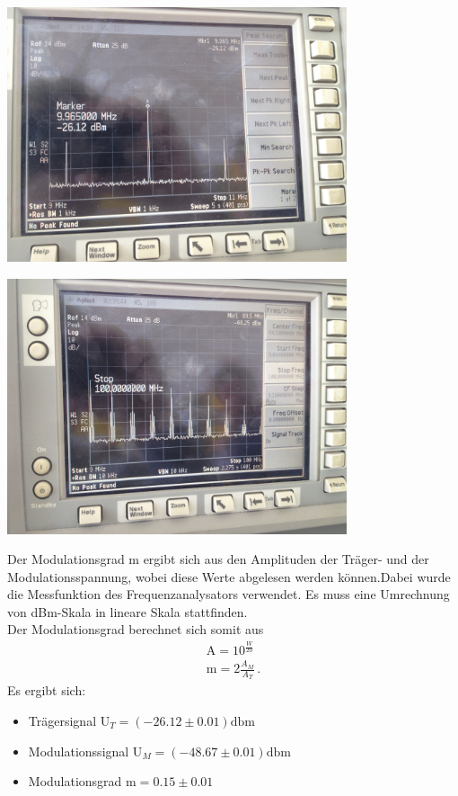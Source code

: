 \documentclass[]{scrartcl}
\begin{document}
\begin{center}
	\includegraphics[width=10cm]{images/freqampmoddio.jpg}
	\label{fig:freqdio}
\end{center}
\begin{center}
	\includegraphics[width=10cm]{images/oberwellen.jpg}
	\label{fig:oberwellen}
\end{center}
Der Modulationsgrad m ergibt sich aus den Amplituden der Träger- und der Modulationsspannung, wobei diese Werte abgelesen werden können.Dabei wurde die Messfunktion des Frequenzanalysators verwendet. Es muss eine Umrechnung von dBm-Skala in lineare Skala stattfinden. \\
Der Modulationsgrad berechnet sich somit aus
\begin{align}
\text{A}=10^{\frac{W}{20}} \\
\text{m}=2\frac{A_M}{A_T}\,.
\end{align}
Es ergibt sich:
\begin{itemize}
	\item Trägersignal U$_T=(-26.12\pm 0.01) \text{dbm}$
	\item Modulationssignal U$_M=(-48.67\pm 0.01) \text{dbm}$
	\item Modulationsgrad m$=0.15\pm 0.01$
\end{itemize}
\end{document}

